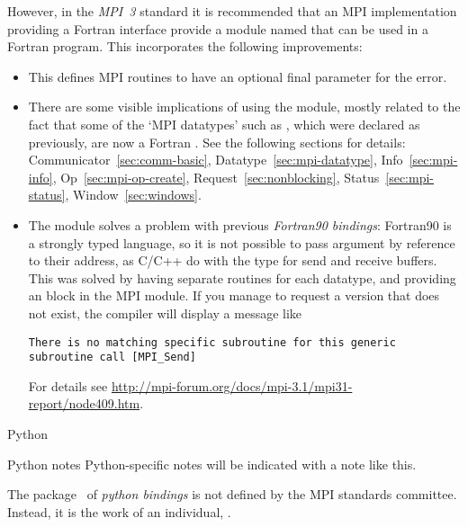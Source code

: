 %
However, in the \emph{MPI~3}%
 standard it is recommended that
an MPI implementation providing a Fortran interface provide a
module named  that can be used in a Fortran program.
This incorporates the following improvements:
\begin{itemize}
\item
  This defines MPI routines to have an optional final parameter for the error.
\item 
  There are some visible implications of using the  module,
  mostly related to the fact that some of the `MPI datatypes' such as
  , which were declared as 
  previously, are now a Fortran .
  See the following sections for details:
  Communicator~\ref{sec:comm-basic}, Datatype~\ref{sec:mpi-datatype},
  Info~\ref{sec:mpi-info}, Op~\ref{sec:mpi-op-create},
  Request~\ref{sec:nonblocking}, Status~\ref{sec:mpi-status},
  Window~\ref{sec:windows}.
\item
  The  module solves a problem with previous
  \emph{Fortran90 bindings}:
  Fortran90 is a strongly typed language, so it is not possible to pass
  argument by reference to their address, as C/C++ do with the 
  type for send and receive buffers. This was solved by having
  separate routines for each datatype, and providing an  block
  in the MPI module. If you manage to request a version that does not exist,
  the compiler will display a message like
\begin{verbatim}
There is no matching specific subroutine for this generic subroutine call [MPI_Send]
\end{verbatim}
%
For details see
\url{http://mpi-forum.org/docs/mpi-3.1/mpi31-report/node409.htm}.
\end{itemize}



 {Python}
\label{sec:python-bind}

\begin{pythonnote}{Python notes}
  Python-specific notes will be indicated with a note like this.
\end{pythonnote}

The  package~\cite{Dalcin:m4py12,mpi4py:homepage}
of \emph{python bindings}
is not defined by the MPI standards committee.
Instead, it is the work of an individual,
.

